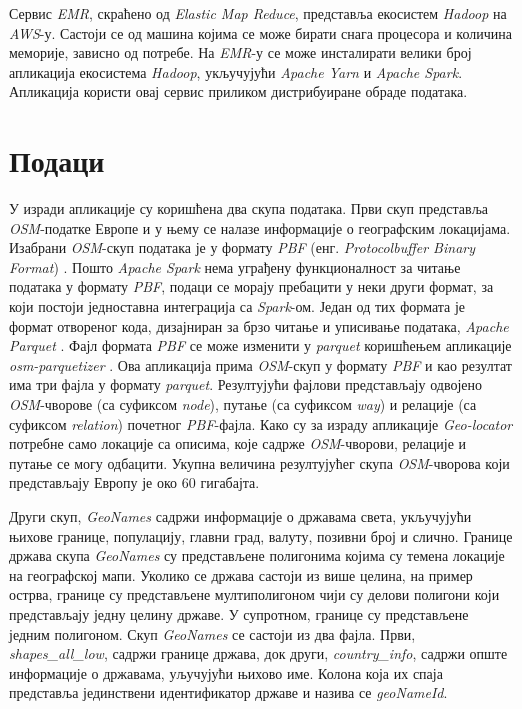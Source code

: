 \documentclass[12pt,oneside]{memoir}
\begin{document}
Сервис \textit{EMR}, скраћено од \textit{Elastic Map Reduce}, представља екосистем \textit{Hadoop} на \textit{AWS}-у. Састоји се од машина којима се може бирати снага процесора и количина меморије, зависно од потребе. На \textit{EMR}-у се може инсталирати велики број апликација екосистема \textit{Hadoop}, укључујући \textit{Apache Yarn} и \textit{Apache Spark}. Апликација користи овај сервис приликом дистрибуиране обраде података.
 
\section{Подаци}
\label{sec:osm_spark_podaci}

У изради апликације су коришћена два скупа података. Први скуп представља \textit{OSM}-податке Европе и у њему се налазе информације о географским локацијама. Изабрани \textit{OSM}-скуп података је у формату \textit{PBF} (енг. \textit{Protocolbuffer Binary Format}) \cite{osm_pbf_format}. Пошто \textit{Apache Spark} нема уграђену функционалност за читање података у формату \textit{PBF}, подаци се морају пребацити у неки други формат, за који постоји једноставна интеграција са \textit{Spark}-ом. Један од тих формата је формат отвореног кода, дизајниран за брзо читање и уписивање података, \textit{Apache Parquet} \cite{apache_parquet}. Фајл формата \textit{PBF} се може изменити у \textit{parquet} коришћењем апликације \textit{osm-parquetizer} \cite{osm_parquetizer}. Ова апликација прима \textit{OSM}-скуп у формату \textit{PBF} и као резултат има три фајла у формату \textit{parquet}. Резултујући фајлови представљају одвојено  \textit{OSM}-чворове (са суфиксом \textit{node}), путање (са суфиксом \textit{way}) и релације (са суфиксом \textit{relation}) почетног \textit{PBF}-фајла. Како су за израду апликације \textit{Geo-locator} потребне само локације са описима, које садрже \textit{OSM}-чворови, релације и путање се могу одбацити. Укупна величина резултујућег скупа \textit{OSM}-чворова који представљају Европу је око 60 гигабајта.

Други скуп, \textit{GeoNames} \cite{geonames} садржи информације о државама света, укључујући њихове границе, популацију, главни град, валуту, позивни број и слично. Границе држава скупа \textit{GeoNames} су представљене полигонима којима су темена локације на географској мапи. Уколико се држава састоји из више целина, на пример острва, границе су представљене мултиполигоном чији су делови полигони који представљају једну целину државе. У супротном, границе су представљене једним полигоном. Скуп \textit{GeoNames} се састоји из два фајла. Први, \textit{shapes\_all\_low}, садржи границе држава, док други, \textit{country\_info}, садржи опште информације о државама, уључујући њихово име. Колона која их спаја представља јединствени идентификатор државе и назива се \textit{geoNameId}.
\end{document}
